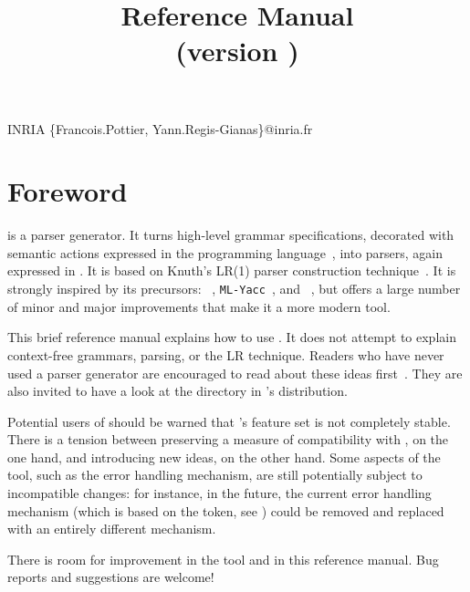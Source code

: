 \documentclass[onecolumn,11pt,nocopyrightspace,preprint]{sigplanconf}
\title{\menhir Reference Manual\\\normalsize (version \menhirversion)}
\begin{document}
	   {INRIA}
	   {\{Francois.Pottier, Yann.Regis-Gianas\}@inria.fr}

\maketitle


\clearpage
\tableofcontents
\clearpage


\section{Foreword}

\menhir is a parser generator. It turns high-level grammar specifications,
decorated with semantic actions expressed in the \ocaml programming
language~\cite{objective-caml}, into parsers, again expressed in \ocaml. It is
based on Knuth's LR(1) parser construction technique~\cite{knuth-lr-65}. It is
strongly inspired by its precursors: \yacc~\cite{johnson-yacc-79},
\texttt{ML-Yacc}~\cite{tarditi-appel-00}, and \ocamlyacc~\cite{objective-caml},
but offers a large number of minor and major improvements that make it a more
modern tool.

This brief reference manual explains how to use \menhir. It does not attempt to
explain context-free grammars, parsing, or the LR technique. Readers who have
never used a parser generator are encouraged to read about these ideas
first~\cite{aho-86,appel-tiger-98,hopcroft-motwani-ullman-00}. They are also
invited to have a look at the  directory in \menhir's
distribution.

Potential users of \menhir should be warned that \menhir's feature set is not
completely stable. There is a tension between preserving a measure of
compatibility with \ocamlyacc, on the one hand, and introducing new ideas, on
the other hand. Some aspects of the tool, such as the error handling
mechanism, are still potentially subject to incompatible changes: for
instance, in the future, the current error handling mechanism (which is based
on the \error token, see ) could be removed and replaced with
an entirely different mechanism.

There is room for improvement in the tool and in this reference manual. Bug
reports and suggestions are welcome!
\end{document}
